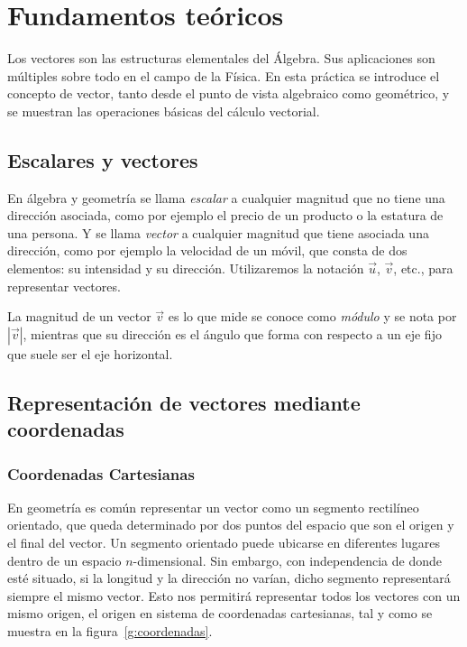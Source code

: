 \documentclass[a4paper]{article}
\begin{document}
\sloppy
{}

\bigskip

\section*{Fundamentos teóricos}
Los vectores son las estructuras elementales del Álgebra. Sus aplicaciones son múltiples sobre todo en el campo de la Física. En esta práctica se introduce el concepto de vector, tanto desde el punto de vista algebraico como geométrico, y se muestran las operaciones básicas del cálculo vectorial.

\subsection*{Escalares y vectores}
En álgebra y geometría se llama \emph{escalar} a cualquier magnitud que no tiene una dirección asociada, como por ejemplo el precio de un producto o la estatura de una persona. Y se llama \emph{vector} a cualquier magnitud que tiene asociada una dirección, como por ejemplo la velocidad de un móvil, que consta de dos elementos: su intensidad y su dirección. Utilizaremos la notación $\vec{u}$, $\vec{v}$, etc., para representar vectores. 

La magnitud de un vector $\vec{v}$ es lo que mide se conoce como \emph{módulo}
y se nota por $|\vec{v}|$, mientras que su dirección es el ángulo que forma
con respecto a un eje fijo que suele ser el eje horizontal.

\subsection*{Representación de vectores mediante coordenadas}
\subsubsection*{Coordenadas Cartesianas}
En geometría es común representar un vector como un segmento rectilíneo orientado, que queda determinado por dos puntos del espacio que son el origen y el final del vector. Un segmento orientado puede ubicarse en diferentes lugares dentro de un espacio $n$-dimensional. Sin embargo, con independencia de donde esté situado, si la longitud y la dirección no varían, dicho segmento representará siempre el mismo vector. Esto nos permitirá representar todos los vectores con un mismo origen, el origen en sistema de coordenadas cartesianas, tal y como se muestra en la figura~\ref{g:coordenadas}.
\end{document}
